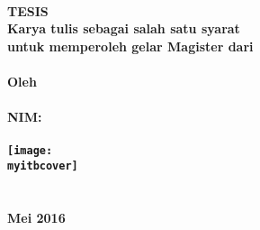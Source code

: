\thispagestyle{empty}
\begin{center}
\textbf{\large
	\MakeUppercase{\judul} \\
	\vfill
	TESIS \\
	\bigskip
	{\normalsize
		Karya tulis sebagai salah satu syarat \\
		untuk memperoleh gelar Magister dari \\
		\itb{} \\
	}
	\vfill
	{\normalsize Oleh} \\
	\MakeUppercase{\myname{}} \\
	NIM: \mysid{} \\
	\mydept{} \\
	\vfill
	\texttt{[image: \\myitbcover]} \\
	\vfill
	\normalsize
	\MakeUppercase{\tfakultas} \\
	\MakeUppercase{\itb{}} \\
	Mei 2016 \\
}
\end{center}
